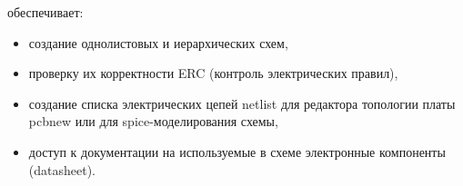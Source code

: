 

обеспечивает:

\begin{itemize}
\item создание однолистовых и иерархических схем,
\item проверку их корректности ERC (контроль электрических правил),
\item создание списка электрических цепей netlist для редактора топологии платы
pcbnew или для spice-моделирования схемы, 
\item доступ к документации на используемые в схеме электронные компоненты
(datasheet).
\end{itemize}
